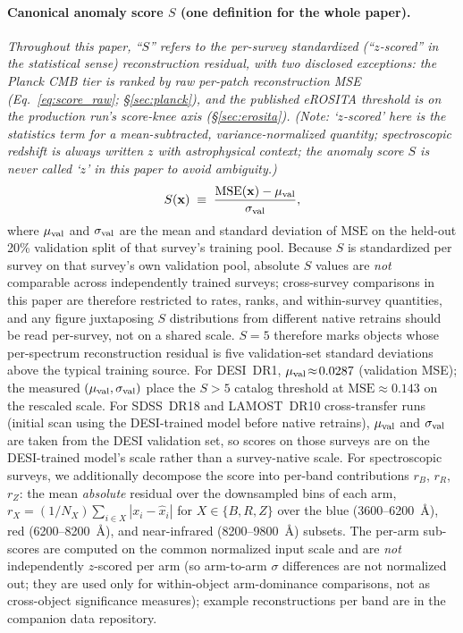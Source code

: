 \documentclass[aps,prd,twocolumn,superscriptaddress,showpacs,preprintnumbers,nofootinbib,longbibliography,floatfix]{revtex4-2}
\begin{document}
\paragraph{Canonical anomaly score $S$ (one definition for the whole paper).}
\emph{Throughout this paper, ``$S$'' refers to the per-survey standardized (``$z$-scored'' in the statistical sense) reconstruction residual, with two disclosed exceptions: the Planck CMB tier is ranked by raw per-patch reconstruction MSE (Eq.~\ref{eq:score_raw}; \S\ref{sec:planck}), and the published eROSITA threshold is on the production run's score-knee axis (\S\ref{sec:erosita}). (Note: `$z$-scored' here is the statistics term for a mean-subtracted, variance-normalized quantity; spectroscopic redshift is always written $z$ with astrophysical context; the anomaly score $S$ is never called `$z$' in this paper to avoid ambiguity.)}
\begin{equation}\label{eq:score}
S(\mathbf{x}) \;\equiv\; \frac{\mathrm{MSE}(\mathbf{x}) - \mu_{\rm val}}{\sigma_{\rm val}},
\end{equation}
where $\mu_{\rm val}$ and $\sigma_{\rm val}$ are the mean and standard deviation of $\mathrm{MSE}$ on the held-out 20\% validation split of that survey's training pool. Because $S$ is standardized per survey on that survey's own validation pool, absolute $S$ values are \emph{not} comparable across independently trained surveys; cross-survey comparisons in this paper are therefore restricted to rates, ranks, and within-survey quantities, and any figure juxtaposing $S$ distributions from different native retrains should be read per-survey, not on a shared scale. $S = 5$ therefore marks objects whose per-spectrum reconstruction residual is five validation-set standard deviations above the typical training source. For DESI~DR1, $\mu_{\rm val} \!\approx\! 0.0287$ (validation MSE); the measured $(\mu_{\rm val}, \sigma_{\rm val})$ place the $S>5$ catalog threshold at $\mathrm{MSE} \!\approx\! 0.143$ on the rescaled scale. For SDSS~DR18 and LAMOST~DR10 cross-transfer runs (initial scan using the DESI-trained model before native retrains), $\mu_{\rm val}$ and $\sigma_{\rm val}$ are taken from the DESI validation set, so scores on those surveys are on the DESI-trained model's scale rather than a survey-native scale. For spectroscopic surveys, we additionally decompose the score into per-band contributions $r_B$, $r_R$, $r_Z$: the mean \emph{absolute} residual over the downsampled bins of each arm, $r_X = (1/N_X)\sum_{i \in X} |x_i - \hat x_i|$ for $X \in \{B, R, Z\}$ over the blue (3600--6200~\AA), red (6200--8200~\AA), and near-infrared (8200--9800~\AA) subsets. The per-arm sub-scores are computed on the common normalized input scale and are \emph{not} independently $z$-scored per arm (so arm-to-arm $\sigma$ differences are not normalized out; they are used only for within-object arm-dominance comparisons, not as cross-object significance measures); example reconstructions per band are in the companion data repository.
\end{document}
